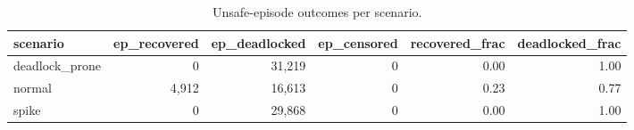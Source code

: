 \begin{table}[t]
\centering
\footnotesize
\caption{Unsafe-episode outcomes per scenario.}
\label{tab:episodes}
\begin{tabular}{lrrrrr}
\toprule
scenario & ep\_recovered & ep\_deadlocked & ep\_censored & recovered\_frac & deadlocked\_frac \\
\midrule
deadlock\_prone & 0 & 31{,}219 & 0 & 0.00 & 1.00 \\
normal & 4{,}912 & 16{,}613 & 0 & 0.23 & 0.77 \\
spike & 0 & 29{,}868 & 0 & 0.00 & 1.00 \\
\bottomrule
\end{tabular}
\end{table}
